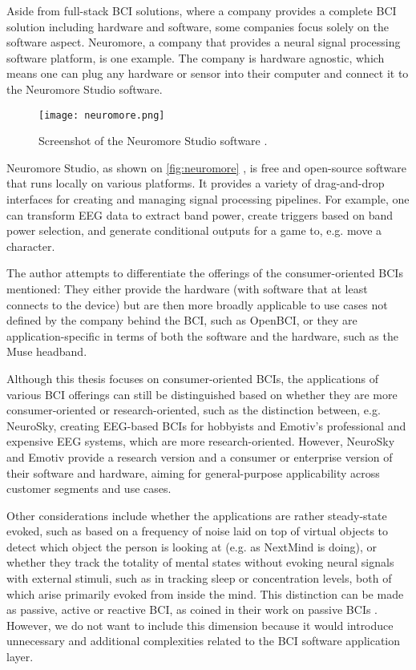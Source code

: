 Aside from full-stack BCI solutions, where a company provides a complete BCI solution including hardware and software, some companies focus solely on the software aspect. Neuromore, a company that provides a neural signal processing software platform, is one example. The company is hardware agnostic, which means one can plug any hardware or sensor into their computer and connect it to the Neuromore Studio software.

\begin{figure}[ht]
  \centering
  \texttt{[image: neuromore.png]}
  \caption{Screenshot of the Neuromore Studio software \citep{neuromore_neuromore_nodate}.}
  \label{fig:neuromore}
\end{figure}

Neuromore Studio, as shown on \autoref{fig:neuromore} , is free and open-source software that runs locally on various platforms. It provides a variety of drag-and-drop interfaces for creating and managing signal processing pipelines. For example, one can transform EEG data to extract band power, create triggers based on band power selection, and generate conditional outputs for a game to, e.g. move a character.

The author attempts to differentiate the offerings of the consumer-oriented BCIs mentioned: They either provide the hardware (with software that at least connects to the device) but are then more broadly applicable to use cases not defined by the company behind the BCI, such as OpenBCI, or they are application-specific in terms of both the software and the hardware, such as the Muse headband.

Although this thesis focuses on consumer-oriented BCIs, the applications of various BCI offerings can still be distinguished based on whether they are more consumer-oriented or research-oriented, such as the distinction between, e.g. NeuroSky, creating EEG-based BCIs for hobbyists and Emotiv's professional and expensive EEG systems, which are more research-oriented. However, NeuroSky and Emotiv provide a research version and a consumer or enterprise version of their software and hardware, aiming for general-purpose applicability across customer segments and use cases.

Other considerations include whether the applications are rather steady-state evoked, such as based on a frequency of noise laid on top of virtual objects to detect which object the person is looking at (e.g. as NextMind is doing), or whether they track the totality of mental states without evoking neural signals with external stimuli, such as in tracking sleep or concentration levels, both of which arise primarily evoked from inside the mind. This distinction can be made as passive, active or reactive BCI, as \citeauthor{alimardani_passive_2020} coined in their work on passive BCIs \citep{alimardani_passive_2020}. However, we do not want to include this dimension because it would introduce unnecessary and additional complexities related to the BCI software application layer.

